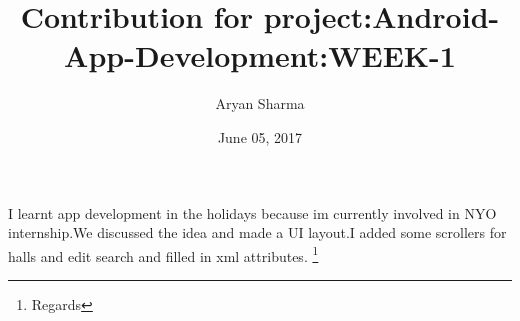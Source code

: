 \documentclass[12pt, letterpaper]{article}
\title{Contribution for project:Android-App-Development:WEEK-1}
\date{June 05, 2017}
\author{Aryan Sharma}
\begin{document}
\maketitle
I learnt app development in the holidays because im currently involved in NYO internship.We discussed the idea and made a UI layout.I added some scrollers for halls and edit search and filled in xml attributes.
\thanks{Regards}
\end{document}
